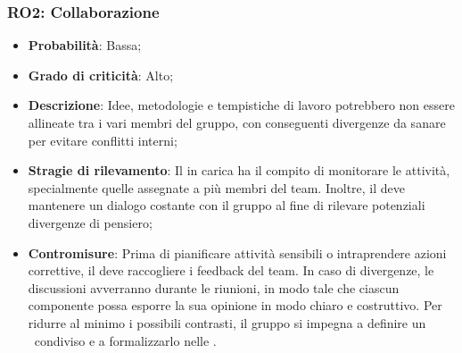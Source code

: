 \subsubsection{RO2: Collaborazione}
\begin{itemize}
    \item \textbf{Probabilità}: Bassa;
    \item \textbf{Grado di criticità}: Alto;
    \item \textbf{Descrizione}: Idee, metodologie e tempistiche di lavoro potrebbero non essere allineate tra i vari membri del gruppo, con conseguenti divergenze da sanare per evitare conflitti interni;
    \item \textbf{Stragie di rilevamento}: Il \Responsabile{} in carica ha il compito di monitorare le attività, specialmente quelle assegnate a più membri del team. Inoltre, il \Responsabile{} deve mantenere un dialogo costante con il gruppo al fine di rilevare potenziali divergenze di pensiero;
    \item \textbf{Contromisure}: Prima di pianificare attività sensibili o intraprendere azioni correttive, il \Responsabile{} deve raccogliere i feedback del team. In caso di divergenze, le discussioni avverranno durante le riunioni, in modo tale che ciascun componente possa esporre la sua opinione in modo chiaro e costruttivo. Per ridurre al minimo i possibili contrasti, il gruppo si impegna a definire un \WoW\ condiviso e a formalizzarlo nelle \NdP.
\end{itemize}
